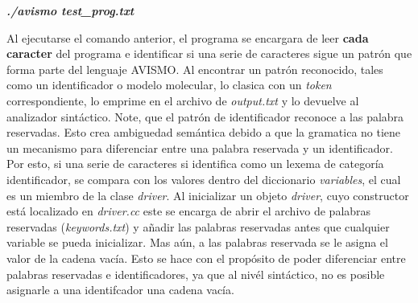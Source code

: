 \begin{center}
\textbf{\textit{./avismo test\_prog.txt}}
\end{center}

Al ejecutarse el comando anterior, el programa se encargara de leer \textbf{cada caracter} del programa e identificar si una serie de caracteres sigue un patrón que forma parte del lenguaje AVISMO. Al encontrar un patrón reconocido, tales como un identificador o modelo molecular, lo clasica con un \textit{token} correspondiente, lo emprime en el archivo de \textit{output.txt} y lo devuelve al analizador sintáctico. Note, que el patrón de identificador reconoce a las palabra reservadas. Esto crea ambiguedad semántica debido a que la gramatica no tiene un mecanismo para diferenciar entre una palabra reservada y un identificador. Por esto, si una serie de caracteres si identifica como un lexema de categoría identificador, se compara con los valores dentro del diccionario \textit{variables}, el cual es un miembro de la clase \textit{driver}. Al inicializar un objeto \textit{driver}, cuyo constructor está localizado en \textit{driver.cc} este se encarga de abrir el archivo de
palabras reservadas (\textit{keywords.txt}) y añadir las palabras reservadas antes que cualquier variable se pueda inicializar. Mas aún, a las palabras reservada se le asigna el valor de la cadena vacía. Esto se hace con el propósito de poder diferenciar entre palabras reservadas e identificadores, ya que al nivél sintáctico, no es posible asignarle a una identifcador una cadena vacía.
















